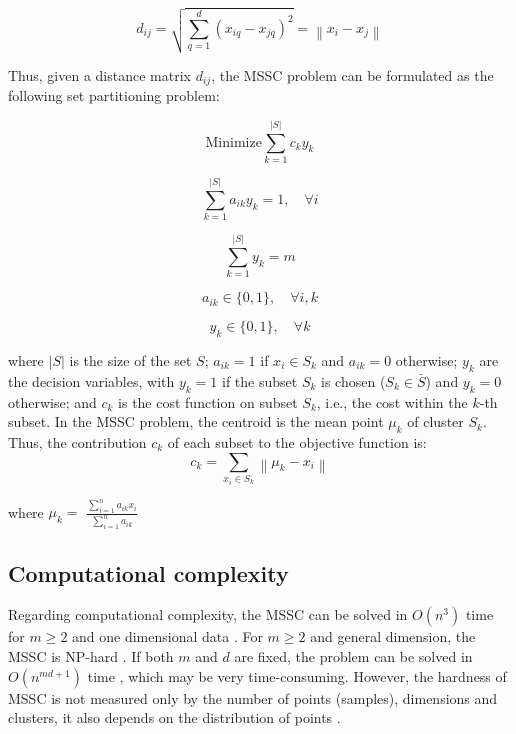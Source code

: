 \begin{equation}
d_{ij} = \sqrt{\sum_{q=1}^{d}(x_{iq} - x_{jq})^2} = \left \| x_i - x_j \right \|
\end{equation}

Thus, given a distance matrix $d_{ij}$, the MSSC problem can be formulated as the following set partitioning problem:

\begin{equation} \label{eq:of}
\textrm{Minimize} \sum_{k=1}^{\left | S \right |}c_ky_k
\end{equation}

\begin{equation}
\sum_{k=1}^{\left | S \right |}a_{ik}y_k = 1, \quad \forall i
\end{equation}

\begin{equation}
\sum_{k=1}^{\left | S \right |}y_k = m
\end{equation}

\begin{equation}
a_{ik} \in \{0,1\}, \quad \forall i,k
\end{equation}

\begin{equation}
y_k \in \{0,1\}, \quad \forall k
\end{equation}

\noindent where $\left | S \right |$ is the size of the set $S$; $a_{ik} = 1$ if $x_i \in S_k$ and $a_{ik} = 0$ otherwise; $y_k$ are the decision variables, with $y_k = 1$ if the subset $S_k$ is chosen ($S_k \in \bar{S}$) and $y_k = 0$ otherwise; and $c_k$ is the cost function on subset $S_k$, i.e., the cost within the $k$-th subset. In the MSSC problem, the centroid is the mean point $\mu_k$ of cluster $S_k$. Thus, the contribution $c_k$ of each subset to the objective function is:
	\begin{equation}
	c_k = \sum_{x_i \in S_k}\left \| \mu_k - x_i \right \|
	\end{equation}
	\begin{center}
	where $\mu_k = $ \Large $\frac{\sum_{i = 1}^{n}a_{ik}x_i}{\sum_{i = 1}^{n}a_{ik}}$	
	\end{center}
	
\subsection{Computational complexity}
Regarding computational complexity, the MSSC can be solved in $O(n^3)$ time for $m \geq 2$ and one dimensional data \cite{Spath1980}. For $m \geq 2$ and general dimension, the MSSC is NP-hard \cite{Aloise2009}. If both $m$ and $d$ are fixed, the problem can be solved in $O(n^{md+1})$ time \cite{Inaba1994}, which may be very time-consuming. However, the hardness of MSSC is not measured only by the number of points (samples), dimensions and clusters, it also depends on the distribution of points \cite{Aloise2009Branch}.

